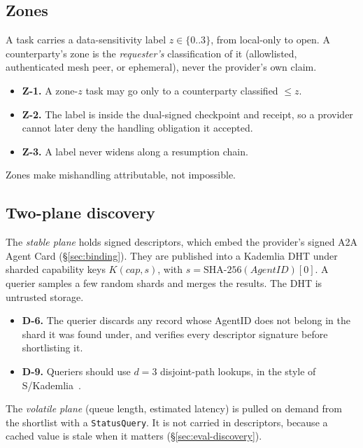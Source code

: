 \subsection{Zones}
\label{sec:zones}
A task carries a data-sensitivity label $z\in\{0..3\}$, from local-only
to open. A counterparty's zone is the \emph{requester's} classification
of it (allowlisted, authenticated mesh peer, or ephemeral), never the
provider's own claim.
\begin{itemize}
\item \textbf{Z-1.} A zone-$z$ task may go only to a counterparty
  classified $\le z$.
\item \textbf{Z-2.} The label is inside the dual-signed checkpoint and
  receipt, so a provider cannot later deny the handling obligation it
  accepted.
\item \textbf{Z-3.} A label never widens along a resumption chain.
\end{itemize}
Zones make mishandling attributable, not impossible.

\subsection{Two-plane discovery}
\label{sec:discovery}
The \emph{stable plane} holds signed descriptors, which embed the
provider's signed A2A Agent Card (\S\ref{sec:binding}). They are
published into a Kademlia DHT under sharded capability keys
$K(\mathit{cap},s)$, with $s=\mathrm{SHA\text{-}256}(\mathit{AgentID})[0]$.
A querier samples a few random shards and merges the results. The DHT is
untrusted storage.
\begin{itemize}
\item \textbf{D-6.} The querier discards any record whose AgentID does not
  belong in the shard it was found under, and verifies every descriptor
  signature before shortlisting it.
\item \textbf{D-9.} Queriers should use $d{=}3$ disjoint-path lookups, in
  the style of S/Kademlia~\cite{baumgart2007skademlia}.
\end{itemize}
The \emph{volatile plane} (queue length, estimated latency) is pulled on
demand from the shortlist with a \texttt{StatusQuery}. It is not
carried in descriptors, because a cached value is stale when it matters
(\S\ref{sec:eval-discovery}).
